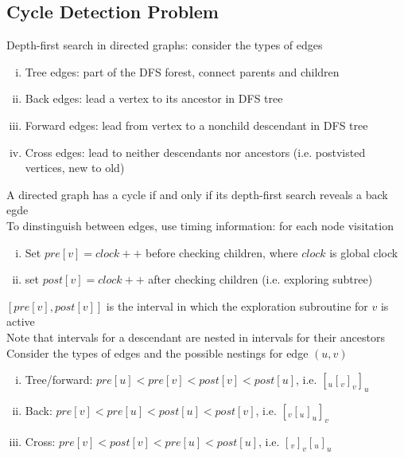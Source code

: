 \documentclass{article}
\begin{document}
		\subsection{Cycle Detection Problem}
			Depth-first search in directed graphs: consider the types of edges
			\begin{enumerate}[(i)]
				\item Tree edges: part of the DFS forest, connect parents and children
				\item Back edges: lead a vertex to its ancestor in DFS tree
				\item Forward edges: lead from vertex to a nonchild descendant in DFS tree
				\item Cross edges: lead to neither descendants nor ancestors (i.e. postvisted vertices, new to old)
				\end{enumerate}
			A directed graph has a cycle if and only if its depth-first search reveals a back egde \\
			To dinstinguish between edges, use timing information: for each node visitation
			\begin{enumerate}[(i)]
				\item Set $pre[v] = clock++$ before checking children, where $clock$ is global clock
				\item set $post[v] = clock++$ after checking children (i.e. exploring subtree)
			\end{enumerate}
			$[pre[v], post[v]]$ is the interval in which the exploration subroutine for $v$ is active \\
			Note that intervals for a descendant are nested in intervals for their ancestors \\
			Consider the types of edges and the possible nestings for edge $(u, v)$
			\begin{enumerate}[(i)]
				\item Tree/forward: $pre[u] < pre[v] < post[v] < post[u]$, i.e. $[_u[_v]_v]_u$
				\item Back: $pre[v] < pre[u] < post[u] < post[v]$, i.e. $[_v[_u]_u]_v$
				\item Cross: $pre[v] < post[v] < pre[u] < post[u]$, i.e. $[_v]_v[_u]_u$
				\end{enumerate}
\end{document}
